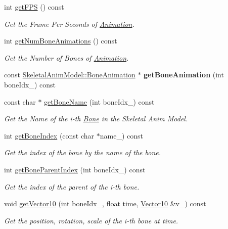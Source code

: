 \begin{DoxyCompactItemize}
int \hyperlink{class_magnum_1_1_skeletal_anim_model_a1bc35db9163ca837819e73638fae5439}{get\+F\+PS} () const 
\begin{DoxyCompactList}\small\item\em Get the Frame Per Seconds of \hyperlink{class_magnum_1_1_skeletal_anim_model_1_1_animation}{Animation}. \end{DoxyCompactList}\item 
int \hyperlink{class_magnum_1_1_skeletal_anim_model_ab47724d8d92d7922861bd16fb2e22bb4}{get\+Num\+Bone\+Animations} () const 
\begin{DoxyCompactList}\small\item\em Get the Number of Bones of \hyperlink{class_magnum_1_1_skeletal_anim_model_1_1_animation}{Animation}. \end{DoxyCompactList}\item 
const \hyperlink{class_magnum_1_1_skeletal_anim_model_1_1_bone_animation}{Skeletal\+Anim\+Model\+::\+Bone\+Animation} $\ast$ {\bfseries get\+Bone\+Animation} (int bone\+Idx\+\_\+) const \hypertarget{class_magnum_1_1_skeletal_anim_model_a4feb15ed0cb0f92c864f0ce8bae4c214}{}\label{class_magnum_1_1_skeletal_anim_model_a4feb15ed0cb0f92c864f0ce8bae4c214}

\item 
const char $\ast$ \hyperlink{class_magnum_1_1_skeletal_anim_model_a6eaa1ce7236787eb27695b4daf9c39ca}{get\+Bone\+Name} (int bone\+Idx\+\_\+) const 
\begin{DoxyCompactList}\small\item\em Get the Name of the i-\/th \hyperlink{class_magnum_1_1_skeletal_anim_model_1_1_bone}{Bone} in the Skeletal Anim Model. \end{DoxyCompactList}\item 
int \hyperlink{class_magnum_1_1_skeletal_anim_model_ab38ceb48ac4d659656ef94519b51d0e5}{get\+Bone\+Index} (const char $\ast$name\+\_\+) const 
\begin{DoxyCompactList}\small\item\em Get the index of the bone by the name of the bone. \end{DoxyCompactList}\item 
int \hyperlink{class_magnum_1_1_skeletal_anim_model_a113360e66ffa5139350b9bc974205c84}{get\+Bone\+Parent\+Index} (int bone\+Idx\+\_\+) const 
\begin{DoxyCompactList}\small\item\em Get the index of the parent of the i-\/th bone. \end{DoxyCompactList}\item 
void \hyperlink{class_magnum_1_1_skeletal_anim_model_a91b011db6beac60b235aef06fe0e0064}{get\+Vector10} (int bone\+Idx\+\_\+, float time, \hyperlink{class_magnum_1_1_vector10}{Vector10} \&v\+\_\+) const 
\begin{DoxyCompactList}\small\item\em Get the position, rotation, scale of the i-\/th bone at time. \end{DoxyCompactList}\end{DoxyCompactItemize}
